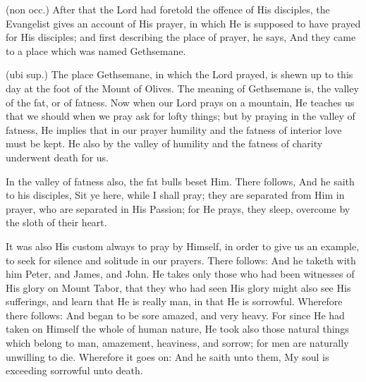  

 (non occ.) After that the Lord had foretold the offence of His disciples, the Evangelist gives an account of His prayer, in which He is supposed to have prayed for His disciples; and first describing the place of prayer, he says, And they came to a place which was named Gethsemane.

 (ubi sup.) The place Gethsemane, in which the Lord prayed, is shewn up to this day at the foot of the Mount of Olives. The meaning of Gethsemane is, the valley of the fat, or of fatness. Now when our Lord prays on a mountain, He teaches us that we should when we pray ask for lofty things; but by praying in the valley of fatness, He implies that in our prayer humility and the fatness of interior love must be kept. He also by the valley of humility and the fatness of charity underwent death for us.

 In the valley of fatness also, the fat bulls beset Him. There follows, And he saith to his disciples, Sit ye here, while I shall pray; they are separated from Him in prayer, who are separated in His Passion; for He prays, they sleep, overcome by the sloth of their heart.

 It was also His custom always to pray by Himself, in order to give us an example, to seek for silence and solitude in our prayers. There follows: And he taketh with him Peter, and James, and John. He takes only those who had been witnesses of His glory on Mount Tabor, that they who had seen His glory might also see His sufferings, and learn that He is really man, in that He is sorrowful. Wherefore there follows: And began to be sore amazed, and very heavy. For since He had taken on Himself the whole of human nature, He took also those natural things which belong to man, amazement, heaviness, and sorrow; for men are naturally unwilling to die. Wherefore it goes on: And he saith unto them, My soul is exceeding sorrowful unto death.

